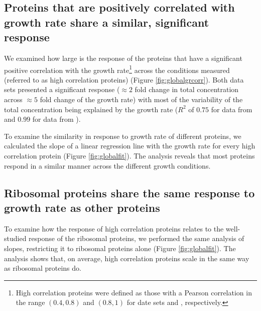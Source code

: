 \documentclass[a4paper,landscape,17pt]{extarticle}
\begin{document}
\clearpage        
\subsection*{Proteins that are positively correlated with growth rate share a similar, significant response}
We examined how large is the response of the proteins that have a significant positive correlation with the growth rate\footnote{High correlation proteins were defined as those with a Pearson correlation in the range $(0.4,0.8)$ and $(0.8,1)$ for date sets \parencite{Heinemann2014} and \parencite{Valgepea2013}, respectively.} across the conditions measured (referred to as high correlation proteins) (Figure \ref{fig:globalgrcorr}).
Both data sets presented a significant response ($\approx 2$ fold change in total concentration across $\approx 5$ fold change of the growth rate) with most of the variability of the total concentration being explained by the growth rate ($R^2$ of $0.75$ for data from \parencite{Heinemann2014} and $0.99$ for data from \parencite{Valgepea2013}). 

To examine the similarity in response to growth rate of different proteins, we calculated the slope of a linear regression line with the growth rate for every high correlation protein (Figure \ref{fig:globalfit}).
The analysis reveals that most proteins respond in a similar manner across the different growth conditions.
\clearpage        

\subsection*{Ribosomal proteins share the same response to growth rate as other proteins}
To examine how the response of high correlation proteins relates to the well-studied response of the ribosomal proteins, we performed the same analysis of slopes, restricting it to ribosomal proteins alone (Figure \ref{fig:globalfit}).
The analysis shows that, on average, high correlation proteins scale in the same way as ribosomal proteins do.
\clearpage        
\end{document}
